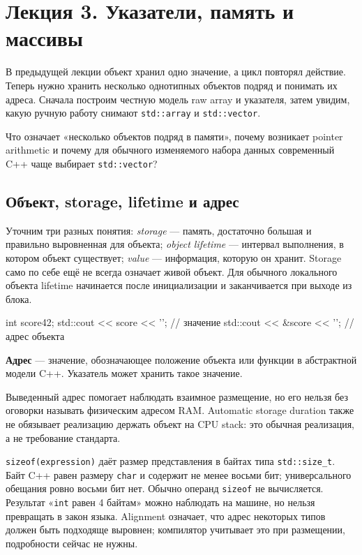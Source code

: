 
\section{Лекция 3. Указатели, память и массивы}
\label{sec:lecture-03}

В предыдущей лекции объект хранил одно значение, а цикл повторял действие.
Теперь нужно хранить несколько однотипных объектов подряд и понимать их
адреса. Сначала построим честную модель raw array и указателя, затем увидим,
какую ручную работу снимают \texttt{std::array} и \texttt{std::vector}.

\begin{importantbox}
Что означает «несколько объектов подряд в памяти», почему возникает pointer
arithmetic и почему для обычного изменяемого набора данных современный C++
чаще выбирает \texttt{std::vector}?
\end{importantbox}

\subsection{Объект, storage, lifetime и адрес}

Уточним три разных понятия: \emph{storage} --- память, достаточно большая и
правильно выровненная для объекта; \emph{object lifetime} --- интервал
выполнения, в котором объект существует; \emph{value} --- информация, которую
он хранит. Storage само по себе ещё не всегда означает живой объект. Для
обычного локального объекта lifetime начинается после инициализации и
заканчивается при выходе из блока.

\begin{cppcode}
int score{42};
std::cout << score << '\n';   // значение
std::cout << &score << '\n';  // адрес объекта
\end{cppcode}

\begin{definition}
\textbf{Адрес} --- значение, обозначающее положение объекта или функции в
абстрактной модели C++. Указатель может хранить такое значение.
\end{definition}

Выведенный адрес помогает наблюдать взаимное размещение, но его нельзя без
оговорки называть физическим адресом RAM. Automatic storage duration также не
обязывает реализацию держать объект на CPU stack: это обычная реализация, а
не требование стандарта.

\texttt{sizeof(expression)} даёт размер представления в байтах типа
\texttt{std::size\_t}. Байт C++ равен размеру \texttt{char} и содержит не
менее восьми бит; универсального обещания ровно восьми бит нет. Обычно операнд
\texttt{sizeof} не вычисляется. Результат «\texttt{int} равен 4 байтам» можно
наблюдать на машине, но нельзя превращать в закон языка. Alignment означает,
что адрес некоторых типов должен быть подходяще выровнен; компилятор учитывает
это при размещении, подробности сейчас не нужны.

